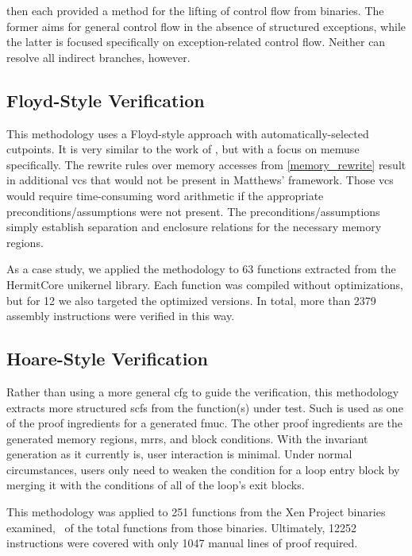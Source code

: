 then each provided a method for the lifting of control flow from binaries.
The former aims for general control flow in the absence of structured exceptions, while the latter is focused specifically on exception-related control flow.
Neither can resolve all indirect branches, however.

\subsection{Floyd-Style Verification}
This methodology uses a Floyd-style approach \autocite{floyd1967assigning}
with automatically-selected cutpoints.
It is very similar to the work of \textcite{matthews2006verification},
but with a focus on \gls{memuse} specifically.
The rewrite rules over memory accesses from \cref{memory_rewrite}
result in additional \acp{vc} that would not be present in Matthews' framework.
Those \acp{vc} would require time-consuming word arithmetic if the appropriate preconditions/assumptions were not present.
The preconditions/assumptions simply establish separation and enclosure relations for the necessary memory regions.

As a case study, we applied the methodology to \num{63} functions extracted from the HermitCore unikernel library.
Each function was compiled without optimizations, but for \num{12} we also targeted the optimized versions.
In total, more than \num{2379} assembly instructions were verified in this way.

\subsection{Hoare-Style Verification}
Rather than using a more general \ac{cfg} to guide the verification,
this methodology extracts more structured \acp{scf} from the function(s) under test.
Such  is used as one of the proof ingredients for a generated \ac{fmuc}.
The other proof ingredients are the generated memory regions, \acp{mrr}, and block conditions.
With the invariant generation as it currently is, user interaction is minimal.
Under normal circumstances, users only need to weaken the condition for a loop entry block by merging it with the conditions of all of the loop's exit blocks.

This methodology was applied to \num{251} functions from the Xen Project binaries examined, \xenpercentage\ of the total functions from those binaries.
Ultimately, \num{12252} instructions were covered with only \num{1047} manual lines of proof required.

